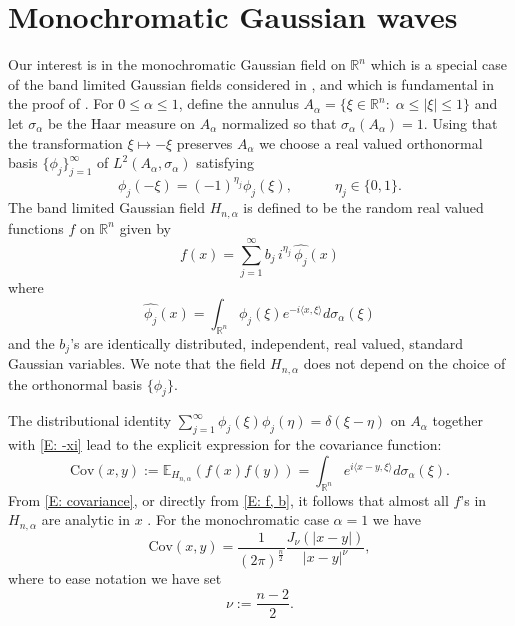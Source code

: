 \documentclass[11pt,reqno]{amsart}
\newcommand{\R}{{\mathbb R}}
\theoremstyle{definition}
\begin{document}
\section{Monochromatic Gaussian waves}\label{monochromatic}
Our interest is in the monochromatic Gaussian field on $\R^n$ which is a special case of the band limited Gaussian fields considered in \cite{SW}, and which is fundamental in the proof of \cite[Theoem 1.1]{SW}. For $0 \leq \alpha \leq 1$, define the annulus $A_\alpha=\{ \xi \in \R^n: \; \alpha \leq |\xi| \leq 1\}$ and let $\sigma_\alpha$ be the Haar measure on $A_\alpha$ normalized so that $\sigma_\alpha(A_\alpha)=1$. Using that the transformation $\xi \mapsto -\xi$ preserves $A_\alpha$  we choose a real valued orthonormal basis $\{\phi_j\}_{j=1}^\infty$ of $L^2( A_\alpha, \sigma_\alpha)$ satisfying 
\begin{equation}\label{E: -xi}
\phi_j(-\xi)= (-1)^{\eta_j} \phi_j(\xi), \qquad \quad \eta_j \in \{0,1\}.
\end{equation}
The band limited Gaussian field $H_{n,\alpha}$ is defined to be the random real valued functions $f$ on $\R^n$ given by 
\begin{equation}\label{E: f, b}
f(x)=\sum_{j=1}^\infty b_j\, i^{\eta_j}\, \widehat {\phi_j}(x)
\end{equation}
where
\begin{equation}\label{E: hat phi}
\widehat {\phi_j}(x)= \int_{\R^n} \phi_j(\xi) e^{- i \langle x, \xi\rangle} d \sigma_\alpha(\xi)
\end{equation}
and the $b_j$'s are identically distributed, independent, real valued, standard Gaussian variables. We note that the field $H_{n, \alpha}$ does not depend on the choice of the orthonormal basis $\{\phi_j\}$.

The distributional identity $\sum_{j=1}^\infty  \phi_j(\xi)  \phi_j(\eta)=\delta(\xi-\eta)$ on $A_\alpha$ together with \eqref{E: -xi} lead to the explicit expression for the covariance function:
 \begin{equation}\label{E: covariance}
 \text{Cov}(x,y):=\mathbb E_{H_{n,\alpha}}(f(x)f(y))=\int_{\R^n} e^{i \langle x-y , \xi \rangle} d\sigma_\alpha(\xi).
 \end{equation}
From \eqref{E: covariance}, or directly from \eqref{E: f, b}, it follows that almost all $f$'s in $H_{n,\alpha}$ are analytic in $x$ \cite{AT}. For the monochromatic case $\alpha=1$ we have 
\begin{equation}\label{E: Covariance}
 \text{Cov}(x,y)=\frac{1}{(2\pi)^{\frac{n}{2}}}\frac{J_{\nu}(|x-y|)}{ |x-y|^{\nu}}, 
 \end{equation}
 where to ease notation we have set 
  \[\nu:=\frac{n-2}{2}.\]
 
\end{document}
